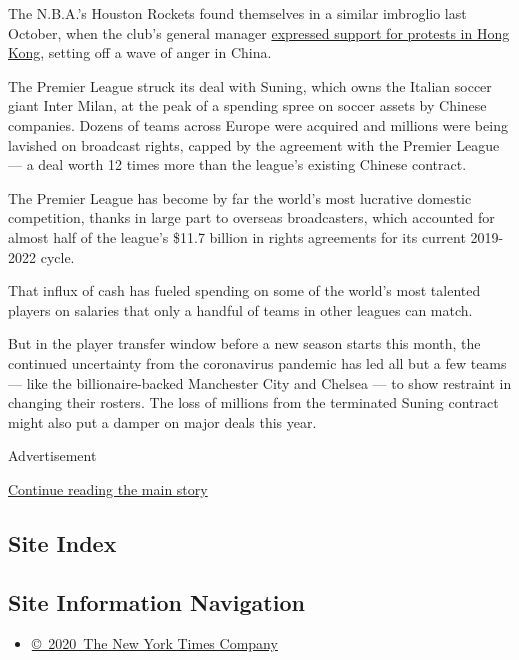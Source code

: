 The N.B.A.'s Houston Rockets found themselves in a similar imbroglio
last October, when the club's general manager
\href{https://www.nytimes3xbfgragh.onion/2019/10/06/sports/daryl-morey-rockets-china.html}{expressed
support for protests in Hong Kong}, setting off a wave of anger in
China.

The Premier League struck its deal with Suning, which owns the Italian
soccer giant Inter Milan, at the peak of a spending spree on soccer
assets by Chinese companies. Dozens of teams across Europe were acquired
and millions were being lavished on broadcast rights, capped by the
agreement with the Premier League --- a deal worth 12 times more than
the league's existing Chinese contract.

The Premier League has become by far the world's most lucrative domestic
competition, thanks in large part to overseas broadcasters, which
accounted for almost half of the league's \$11.7 billion in rights
agreements for its current 2019-2022 cycle.

That influx of cash has fueled spending on some of the world's most
talented players on salaries that only a handful of teams in other
leagues can match.

But in the player transfer window before a new season starts this month,
the continued uncertainty from the coronavirus pandemic has led all but
a few teams --- like the billionaire-backed Manchester City and Chelsea
--- to show restraint in changing their rosters. The loss of millions
from the terminated Suning contract might also put a damper on major
deals this year.

Advertisement

\protect\hyperlink{after-bottom}{Continue reading the main story}

\hypertarget{site-index}{%
\subsection{Site Index}\label{site-index}}

\hypertarget{site-information-navigation}{%
\subsection{Site Information
Navigation}\label{site-information-navigation}}

\begin{itemize}
\tightlist
\item
  \href{https://help.nytimes3xbfgragh.onion/hc/en-us/articles/115014792127-Copyright-notice}{©~2020~The
  New York Times Company}
\end{itemize}

